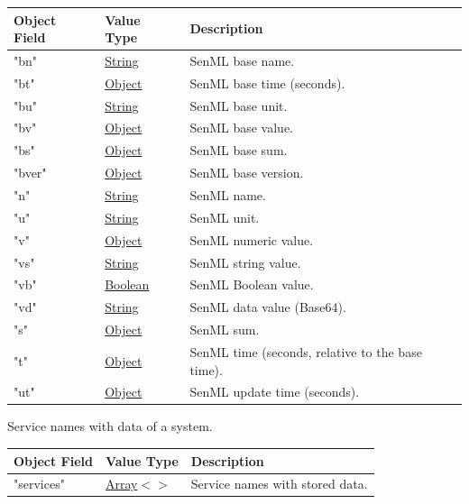 \documentclass[a4paper]{arrowhead}
\newcommand{\pref}[1]{{\textcolor{ArrowheadGrey}{\hyperref[sec:model:primitives:#1]{#1}}}}
\begin{document}
\noindent\begin{tabularx}{\textwidth}{| >{\raggedright\arraybackslash}p{3.9cm} | >{\raggedright\arraybackslash\small}p{5.3cm} | X |} \hline
\rowcolor{gray!33} Object Field & Value Type & Description \\ \hline
"bn" & \pref{String} & SenML base name. \\ \hline
"bt" & \pref{Object} & SenML base time (seconds). \\ \hline
"bu" & \pref{String} & SenML base unit. \\ \hline
"bv" & \pref{Object} & SenML base value. \\ \hline
"bs" & \pref{Object} & SenML base sum. \\ \hline
"bver" & \pref{Object} & SenML base version. \\ \hline
"n" & \pref{String} & SenML name. \\ \hline
"u" & \pref{String} & SenML unit. \\ \hline
"v" & \pref{Object} & SenML numeric value. \\ \hline
"vs" & \pref{String} & SenML string value. \\ \hline
"vb" & \pref{Boolean} & SenML Boolean value. \\ \hline
"vd" & \pref{String} & SenML data value (Base64). \\ \hline
"s" & \pref{Object} & SenML sum. \\ \hline
"t" & \pref{Object} & SenML time (seconds, relative to the base time). \\ \hline
"ut" & \pref{Object} & SenML update time (seconds). \\ \hline
\end{tabularx}




Service names with data of a system.


\noindent\begin{tabularx}{\textwidth}{| >{\raggedright\arraybackslash}p{3.9cm} | >{\raggedright\arraybackslash\small}p{5.3cm} | X |} \hline
\rowcolor{gray!33} Object Field & Value Type & Description \\ \hline
"services" & \pref{Array}$<$\allowbreak{}\pref{String}$>$ & Service names with stored data. \\ \hline
\end{tabularx}



\end{document}
